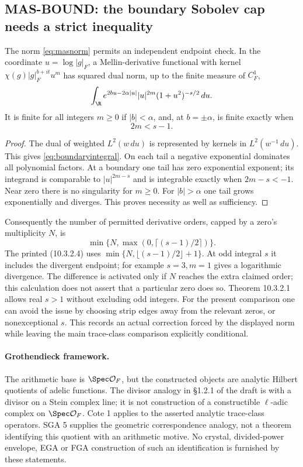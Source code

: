 \subsection{MAS-BOUND: the boundary Sobolev cap needs a strict inequality}
The norm \eqref{eq:masnorm} permits an independent endpoint check. In the coordinate $u=\log|g|_F$, a Mellin-derivative functional with kernel $\chi(g)|g|_F^{b+it}u^m$ has squared dual norm, up to the finite measure of $C_F^1$,
\begin{equation}\label{eq:boundaryintegral}
 \int_\R e^{2bu-2\alpha|u|}|u|^{2m}(1+u^2)^{-s/2}\,du.
\end{equation}
It is finite for all integers $m\ge0$ if $|b|<\alpha$, and, at $b=\pm\alpha$, is finite exactly when
\begin{equation}\label{eq:strictcap}
 2m<s-1.
\end{equation}
\begin{proof}
The dual of weighted $L^2(w\,du)$ is represented by kernels in $L^2(w^{-1}\,du)$. This gives \eqref{eq:boundaryintegral}. On each tail a negative exponential dominates all polynomial factors. At a boundary one tail has zero exponential exponent; its integrand is comparable to $|u|^{2m-s}$ and is integrable exactly when $2m-s<-1$. Near zero there is no singularity for $m\ge0$. For $|b|>\alpha$ one tail grows exponentially and diverges. This proves necessity as well as sufficiency.
\end{proof}
Consequently the number of permitted derivative orders, capped by a zero's multiplicity $N$, is
\[
 \min\{N,\max(0,\lceil(s-1)/2\rceil)\}.
\]
The printed (10.3.2.4) uses $\min\{N,\lfloor(s-1)/2\rfloor+1\}$. At odd integral $s$ it includes the divergent endpoint; for example $s=3,m=1$ gives a logarithmic divergence. The difference is activated only if $N$ reaches the extra claimed order; this calculation does not assert that a particular zero does so. Theorem 10.3.2.1 allows real $s>1$ without excluding odd integers. For the present comparison one can avoid the issue by choosing strip edges away from the relevant zeros, or nonexceptional $s$. This records an actual correction forced by the displayed norm while leaving the main trace-class comparison explicitly conditional.

\paragraph{Grothendieck framework.}
The arithmetic base is $\Spec\mathcal O_F$, but the constructed objects are analytic Hilbert quotients of adelic functions. The divisor analogy in \S1.2.1 of the draft is with a divisor on a Stein complex line; it is not construction of a constructible $\ell$-adic complex on $\Spec\mathcal O_F$. Cote 1 applies to the asserted analytic trace-class operators. SGA 5 supplies the geometric correspondence analogy, not a theorem identifying this quotient with an arithmetic motive. No crystal, divided-power envelope, EGA or FGA construction of such an identification is furnished by these statements.

